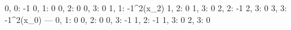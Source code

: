 0, 0: -1
0, 1: 0
0, 2: 0
0, 3: 0
1, 1: -1\cosh^{2}{\left(x_{2}\right)}
1, 2: 0
1, 3: 0
2, 2: -1
2, 3: 0
3, 3: -1\cosh^{2}{\left(x_{0}\right)}
---
0, 1: 0
0, 2: 0
0, 3: -1
1, 2: -1
1, 3: 0
2, 3: 0
